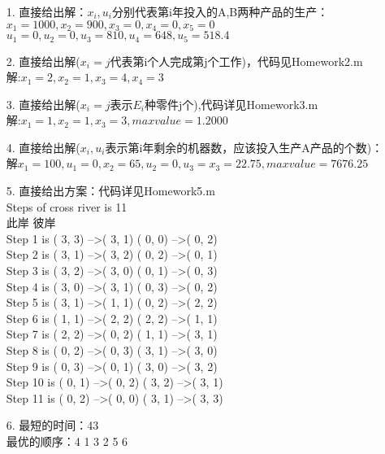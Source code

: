 \documentclass[a4paper,20pt]{article}
\title{}
\author{}
\date{}
\begin{document}
\begin{itemize}
    \item[1.] 直接给出解：$x_i,u_i$分别代表第i年投入的A,B两种产品的生产：
        \\$x_1=1000,x_2=900,x_3=0,x_4=0,x_5=0$
            \\$u_1=0,u_2=0,u_3=810,u_4=648,u_5=518.4$
    \item[2.] 直接给出解($x_i=j$代表第i个人完成第j个工作)，代码见Homework2.m
        \\解:$x_1=2,x_2=1,x_3=4,x_4=3$
    \item[3.] 直接给出解($x_i=j$表示$E_i$种零件j个),代码详见Homework3.m
        \\解:$x_1=1,x_2=1,x_3=3,maxvalue=1.2000$
    \item[4.] 直接给出解($x_i,u_i$表示第i年剩余的机器数，应该投入生产A产品的个数)：
        \\解$x_1=100,u_1=0,x_2=65,u_2=0,u_3=x_3=22.75,maxvalue=7676.25$
    \item[5.] 直接给出方案：代码详见Homework5.m
        \\    Steps of cross river is 11
        \\		        此岸 \qquad\qquad \qquad\qquad\qquad\qquad\qquad                         彼岸
        \\Step  1 is ( 3, 3) --\textgreater ( 3, 1) \qquad \qquad  \qquad      ( 0, 0) --\textgreater ( 0, 2)
        \\Step  2 is ( 3, 1) --\textgreater ( 3, 2) \qquad \qquad  \qquad      ( 0, 2) --\textgreater ( 0, 1)
        \\Step  3 is ( 3, 2) --\textgreater ( 3, 0) \qquad \qquad  \qquad      ( 0, 1) --\textgreater ( 0, 3)
        \\Step  4 is ( 3, 0) --\textgreater ( 3, 1) \qquad \qquad  \qquad      ( 0, 3) --\textgreater ( 0, 2)
        \\Step  5 is ( 3, 1) --\textgreater ( 1, 1) \qquad \qquad  \qquad      ( 0, 2) --\textgreater ( 2, 2)
        \\Step  6 is ( 1, 1) --\textgreater ( 2, 2) \qquad \qquad  \qquad      ( 2, 2) --\textgreater ( 1, 1)
        \\Step  7 is ( 2, 2) --\textgreater ( 0, 2) \qquad \qquad  \qquad      ( 1, 1) --\textgreater ( 3, 1)
        \\Step  8 is ( 0, 2) --\textgreater ( 0, 3) \qquad \qquad  \qquad      ( 3, 1) --\textgreater ( 3, 0)
        \\Step  9 is ( 0, 3) --\textgreater ( 0, 1) \qquad \qquad  \qquad      ( 3, 0) --\textgreater ( 3, 2)
        \\Step 10 is ( 0, 1) --\textgreater ( 0, 2) \qquad \qquad  \qquad      ( 3, 2) --\textgreater ( 3, 1)
        \\Step 11 is ( 0, 2) --\textgreater ( 0, 0) \qquad \qquad  \qquad      ( 3, 1) --\textgreater ( 3, 3)
        \item[6.]最短的时间：43
        \\最优的顺序：4 1 3 2 5 6
\end{itemize}
\end{document}
